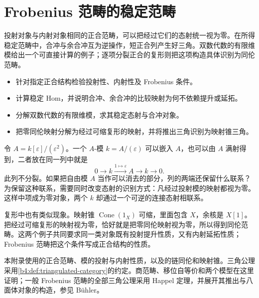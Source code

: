 
\chapter{Frobenius 范畴的稳定范畴}
\label{b4:app:D}

\begin{chapterabstract}
	投射对象与内射对象相同的正合范畴，可以把经过它们的态射统一视为零。在所得稳定范畴中，合冲与余合冲互为逆操作，短正合列产生好三角。双数代数的有限维模给出一个可直接计算的例子；逐项分裂正合的复形则把这项构造具体识别为同伦范畴。
\end{chapterabstract}

\begin{learninggoals}
	\begin{itemize}
		\item 针对指定正合结构检验投射性、内射性及 Frobenius 条件。
		\item 计算稳定 Hom，并说明合冲、余合冲的比较映射为何不依赖提升或延拓。
		\item 分解双数代数的有限维模，求其稳定态射与合冲对象。
		\item 把零同伦映射分解为经过可缩复形的映射，并将推出三角识别为映射锥三角。
	\end{itemize}
\end{learninggoals}

令 \(A=k[\varepsilon]/(\varepsilon^2)\)。一个 \(A\)-模 \(k=A/(\varepsilon)\) 可以嵌入 \(A\)，也可以由 \(A\) 满射得到，二者放在同一列中就是
\[
	0\longrightarrow k\xrightarrow{1\mapsto\varepsilon}A \longrightarrow k\longrightarrow0.
\]
此列不分裂。如果把自由模 \(A\) 当作可以消去的部分，列的两端还保留什么联系？为保留这种联系，需要同时改变态射的识别方式：凡经过投射模的映射都视为零。这样中项成为零对象，两个 \(k\) 却通过一个可逆的连接态射相联系。

\ProseParagraphBreak
复形中也有类似现象。映射锥 \(\operatorname{Cone}(1_X)\) 可缩，里面包含 \(X\)，余核是 \(X[1]\)。把经过可缩复形的映射视为零，恰好就是把零同伦映射视为零，所以得到同伦范畴。这两个例子共同要求同一类对象既有投射提升性质，又有内射延拓性质；Frobenius 范畴把这个条件写成正合结构的性质。

\ProseParagraphBreak
本附录使用的正合范畴、模的投射与内射性质，以及的链同伦和映射锥。三角公理采用\cref{b4:def:triangulated-category}的约定。商范畴、移位自等价和两个模型在这里证明；一般 Frobenius 范畴的全部三角公理采用 Happel 定理，并展开其推出与八面体对象的构造，参见 Bühler\cite[Sections 12 and 13.4]{Buehler2010ExactCategories}。

